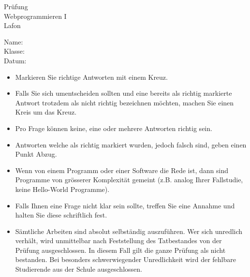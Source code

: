 \documentclass[10pt,ngerman]{examdesign}
\begin{document}
\begin{examtop}
    \parbox{5cm}{
        Pr\"ufung \\
        Webprogrammieren I\\
        Lafon \\
        }
    \hfill
    \parbox{10cm}{
    Name: \hrulefill\\[6pt]
    Klasse: \hrulefill\\[6pt]
    Datum: \hrulefill}
    \bigskip

\begin{itemize}
 \item Markieren Sie richtige Antworten mit einem Kreuz.
 \item Falls Sie sich umentscheiden sollten und eine bereits als richtig
 markierte Antwort trotzdem als nicht richtig bezeichnen m\"ochten, machen Sie
 einen Kreis um das Kreuz.
 \item Pro Frage k\"onnen keine, eine oder mehrere Antworten richtig sein.
 \item Antworten welche als richtig markiert wurden, jedoch falsch sind, geben
 einen Punkt Abzug.
 \item Wenn von einem Programm oder einer Software die Rede ist, dann sind
 Programme von gr\"osserer Komplexit\"at gemeint (z.B. analog Ihrer Fallstudie,
 keine Hello-World Programme).
 \item Falls Ihnen eine Frage nicht klar sein sollte, treffen Sie eine Annahme
 und halten Sie diese schriftlich fest.
 \item Sämtliche Arbeiten sind absolut selbständig auszuführen. Wer sich unredlich verhält,
wird unmittelbar nach Feststellung des Tatbestandes von der Prüfung ausgeschlossen.
In diesem Fall  gilt die ganze Prüfung als nicht bestanden.  Bei  besonders
schwerwiegender Unredlichkeit wird der fehlbare Studierende aus der Schule
ausgeschlossen.
\end{itemize}

\end{examtop}
\end{document}
